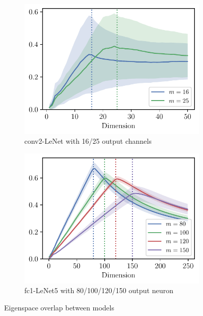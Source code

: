 \begin{figure}[th]
    \centering
    \begin{subfigure}[b]{0.49\textwidth}
        \centering
        \captionsetup{justification=centering}
        \includegraphics[width=\textwidth]{Figures/SubspaceOverlap/Mix/Overlap_LeNet5_varying_conv2.pdf}
        \caption{conv2-LeNet with 16/25 output channels}
        \label{fig:Overlap_conv2}
    \end{subfigure}%
    \begin{subfigure}[b]{0.49\textwidth}
        \centering
        \captionsetup{justification=centering}
        \includegraphics[width=\textwidth]{Figures/SubspaceOverlap/Mix/Overlap_LeNet5_varying_fc1.pdf}
        \caption{fc1-LeNet5 with 80/100/120/150 output neuron}
        \label{fig:Overlap_fc1}
    \end{subfigure}
    \captionsetup{justification=centering}
    \caption{Eigenspace overlap between models}
    \label{fig:overlap}
\end{figure}

